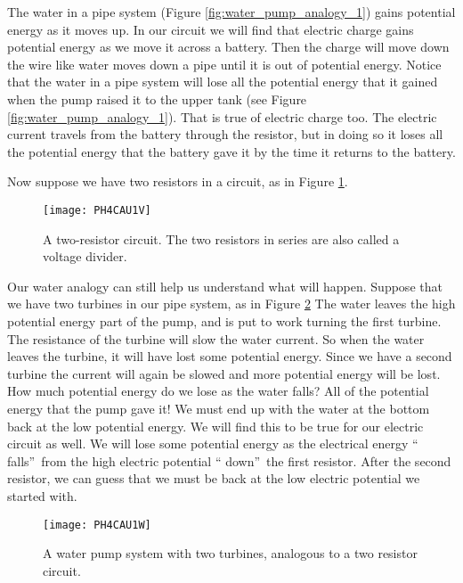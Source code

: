 The water in a pipe system (Figure \ref{fig:water_pump_analogy_1}) gains
potential energy as it moves up. In our circuit we will find that electric
charge gains potential energy as we move it across a battery. Then the
charge will move down the wire like water moves down a pipe until it is out
of potential energy. Notice that the water in a pipe system will lose all
the potential energy that it gained when the pump raised it to the upper
tank (see Figure \ref{fig:water_pump_analogy_1}). 
That is true of electric charge too. The
electric current travels from the battery through the resistor, but in doing
so it loses all the potential energy that the battery gave it by the time it
returns to the battery.

Now suppose we have two resistors in a circuit, as in Figure
\ref{fig:voltage_divider}. 

\begin{figure}[htbp!]
\centering
\texttt{[image: PH4CAU1V]}
\caption[A two-resistor circuit]{A two-resistor circuit. The two 
resistors in series are also called a voltage divider.}
\label{fig:voltage_divider}
\end{figure}

Our water analogy can still help us understand what will happen. Suppose
that we have two turbines in our pipe system, as in Figure
\ref{fig:water_pump_analogy_2}
The water leaves the high
potential energy part of the pump, and is put to work turning the first
turbine. The resistance of the turbine will slow the water current. So when
the water leaves the turbine, it will have lost some potential energy. Since
we have a second turbine the current will again be slowed and more potential
energy will be lost. How much potential energy do we lose as the water
falls? All of the potential energy that the pump gave it! We must end up
with the water at the bottom back at the low potential energy. We will find
this to be true for our electric circuit as well. We will lose some
potential energy as the electrical energy \textquotedblleft
falls\textquotedblright\ from the high electric potential \textquotedblleft
down\textquotedblright\ the first resistor. After the second resistor, we
can guess that we must be back at the low electric potential we started with.
\begin{figure}[htbp!]
\centering
\texttt{[image: PH4CAU1W]}
\caption[A water pump system with two turbines]{A water pump system
with two turbines, analogous to a two resistor circuit.}
\label{fig:water_pump_analogy_2}
\end{figure}

